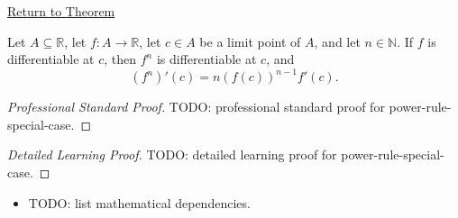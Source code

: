 \newpage
{}
\label{prf:power-rule-special-case}

\begin{remark*}[Return]
\hyperref[cor:power-rule-special-case]{Return to Theorem}
\end{remark*}

\begin{theorem*}
Let $A \subseteq \mathbb{R}$, let $f : A \to \mathbb{R}$, let $c \in A$ be a limit point of $A$, and let $n \in \mathbb{N}$. If $f$ is differentiable at $c$, then $f^n$ is differentiable at $c$, and
\[
(f^n)'(c) = n(f(c))^{n-1}f'(c).
\]
\end{theorem*}

\begin{proof}[Professional Standard Proof]
\LRAProofBodyStart
TODO: professional standard proof for power-rule-special-case.
\end{proof}

\begin{proof}[Detailed Learning Proof]
\LRAProofBodyStart
TODO: detailed learning proof for power-rule-special-case.
\end{proof}

\begin{remark*}
\end{remark*}

\begin{dependencies}
\begin{itemize}
  \item TODO: list mathematical dependencies.
\end{itemize}
\end{dependencies}

\clearpage

